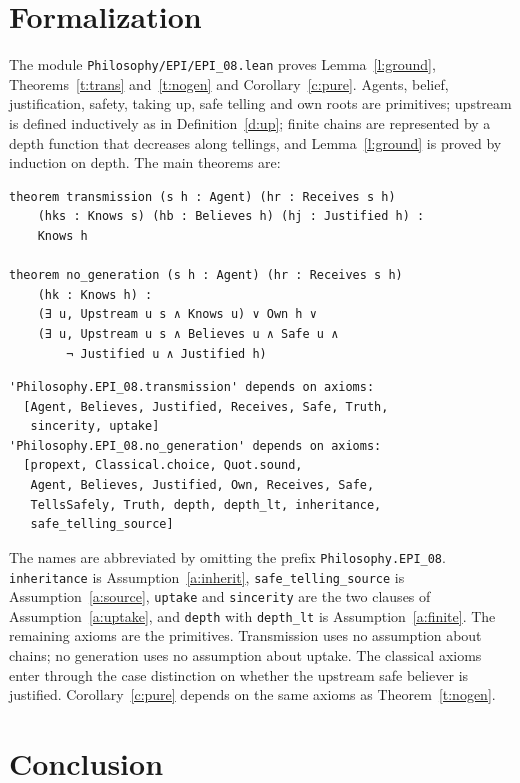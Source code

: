 \documentclass{situationist-preprint}
\begin{document}
\section{Formalization}

The module \nolinkurl{Philosophy/EPI/EPI_08.lean} proves Lemma~\ref{l:ground}, Theorems~\ref{t:trans} and~\ref{t:nogen} and Corollary~\ref{c:pure}. Agents, belief, justification, safety, taking up, safe telling and own roots are primitives; upstream is defined inductively as in Definition~\ref{d:up}; finite chains are represented by a depth function that decreases along tellings, and Lemma~\ref{l:ground} is proved by induction on depth. The main theorems are:

\begin{lstlisting}
theorem transmission (s h : Agent) (hr : Receives s h)
    (hks : Knows s) (hb : Believes h) (hj : Justified h) :
    Knows h

theorem no_generation (s h : Agent) (hr : Receives s h)
    (hk : Knows h) :
    (∃ u, Upstream u s ∧ Knows u) ∨ Own h ∨
    (∃ u, Upstream u s ∧ Believes u ∧ Safe u ∧
        ¬ Justified u ∧ Justified h)
\end{lstlisting}

\begin{lstlisting}
'Philosophy.EPI_08.transmission' depends on axioms:
  [Agent, Believes, Justified, Receives, Safe, Truth,
   sincerity, uptake]
'Philosophy.EPI_08.no_generation' depends on axioms:
  [propext, Classical.choice, Quot.sound,
   Agent, Believes, Justified, Own, Receives, Safe,
   TellsSafely, Truth, depth, depth_lt, inheritance,
   safe_telling_source]
\end{lstlisting}

The names are abbreviated by omitting the prefix \texttt{Philosophy.EPI\_08}. \texttt{inheritance} is Assumption~\ref{a:inherit}, \texttt{safe\_telling\_source} is Assumption~\ref{a:source}, \texttt{uptake} and \texttt{sincerity} are the two clauses of Assumption~\ref{a:uptake}, and \texttt{depth} with \texttt{depth\_lt} is Assumption~\ref{a:finite}. The remaining axioms are the primitives. Transmission uses no assumption about chains; no generation uses no assumption about uptake. The classical axioms enter through the case distinction on whether the upstream safe believer is justified. Corollary~\ref{c:pure} depends on the same axioms as Theorem~\ref{t:nogen}.

\section{Conclusion}
\end{document}
